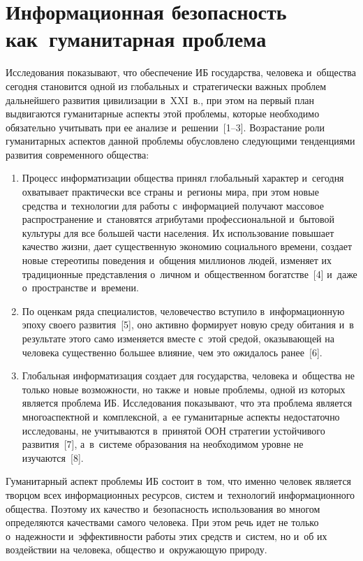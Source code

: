 \begin{multicols}{2}

\label{st\stat}

\section{Информационная безопасность как~гуманитарная 
проблема}

   Исследования показывают, что обеспечение ИБ
государства, человека и~общества сегодня становится одной из 
глобальных и~стратегически важных проблем дальнейшего развития 
цивилизации в~XXI~в., при этом на первый план выдвигаются 
гуманитарные аспекты этой проблемы, которые необходимо обязательно 
учитывать при ее анализе и~решении~[1--3].
   Возрастание роли гуманитарных аспектов данной проблемы обусловлено 
следующими тенденциями развития современного общества:
   \begin{enumerate}[1.]
\item Процесс информатизации общества принял глобальный характер 
и~сегодня охватывает практически все страны и~регионы мира, при этом 
новые средства и~технологии для работы с~информацией получают 
массовое распространение и~становятся атрибутами профессиональной 
и~бытовой культуры для все большей части населения. Их использование 
повышает качество жизни, дает существенную экономию социального 
времени, создает новые стереотипы поведения и~общения миллионов 
людей, изменяет их традиционные представления о~личном 
и~общественном богатстве~[4] и~даже о~пространстве и~времени.\\[-14pt]
\item По оценкам ряда специалистов, человечество вступило 
в~информационную эпоху своего развития~[5], оно активно формирует 
новую среду обитания и~в результате этого само изменяется вместе с~этой 
средой, оказывающей на человека существенно большее влияние, чем 
это ожидалось ранее~[6].
\item Глобальная информатизация создает для государства, человека 
и~общества не только новые возможности, но также и~новые проблемы, 
одной из которых является проблема ИБ. 
Исследования показывают, что эта проблема является многоаспектной 
и~комплексной, а~ее гуманитарные аспекты недостаточно исследованы, не 
учитываются в~принятой ООН стратегии устойчивого развития~[7], 
а~в~системе образования на необходимом уровне не изучаются~[8].
\end{enumerate}

   Гуманитарный аспект проблемы ИБ состоит 
в~том, что именно человек является творцом всех информационных 
ресурсов, систем и~технологий информационного общества. Поэтому их 
качество и~безопасность использования во многом определяются качествами 
самого человека. При этом речь идет не только о~надежности 
и~эффективности работы этих средств и~систем, но и~об их 
воздействии на человека, общество и~окружающую природу.


\end{multicols}
